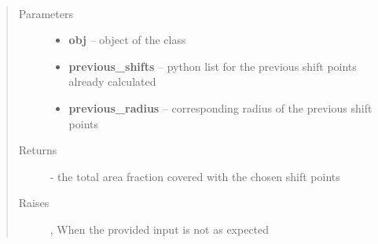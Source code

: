 \documentclass[letterpaper,10pt,english]{sphinxmanual}
\begin{document}
\begin{fulllineitems}
\label{index:brake.solve.cover.calculate_area_fraction}~\begin{quote}\begin{description}
\item[{Parameters}] \leavevmode\begin{itemize}
\item {} 
\textbf{obj} -- object of the class 

\item {} 
\textbf{previous\_shifts} -- python list for the previous shift points already calculated

\item {} 
\textbf{previous\_radius} -- corresponding radius of the previous shift points

\end{itemize}

\item[{Returns}] \leavevmode
{} - the total area fraction covered with the chosen shift points

\item[{Raises }] \leavevmode
{}, When the provided input is not as expected

\end{description}\end{quote}

\end{fulllineitems}

\end{document}

